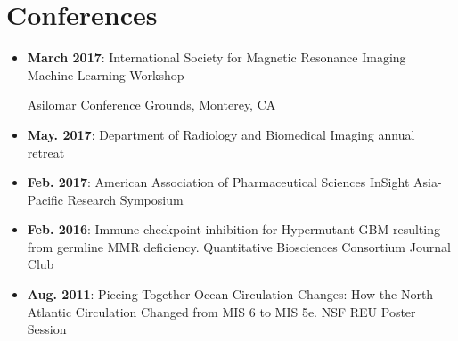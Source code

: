 \documentclass[letterpaper,11pt]{article}
\makeatletter
\newcommand{\resumeItem}[2]{
  \item\small{
    \textbf{#1}{: #2 \vspace{-2pt}}
  }
}
\newcommand{\resumeSubheading}[4]{
  \vspace{-1pt}\item
    \begin{tabular*}{0.97\textwidth}{l@{\extracolsep{\fill}}r}
      \textbf{#1} & #2 \\
      \textit{\small#3} & \textit{\small #4} \\
    \end{tabular*}\vspace{-5pt}
}
\newcommand{\resumeSubItem}[2]{\resumeItem{#1}{#2}\vspace{-4pt}}
\newcommand{\resumeSubHeadingListStart}{\begin{itemize}[leftmargin=*]}
\newcommand{\resumeSubHeadingListEnd}{\end{itemize}}
\newcommand{\resumeItemListStart}{\begin{itemize}}
\newcommand{\resumeItemListEnd}{\end{itemize}\vspace{-5pt}}
\makeatother
\begin{document}
\section{Conferences}
  \resumeSubHeadingListStart
    \resumeItem{March 2017}{International Society for Magnetic Resonance Imaging Machine Learning Workshop}
    {Asilomar Conference Grounds, Monterey, CA}
    \resumeItem{May. 2017}{Department of Radiology and Biomedical Imaging annual retreat}
    \resumeItem{Feb. 2017}{American Association of Pharmaceutical Sciences InSight Asia-Pacific Research Symposium}
    
    \resumeItem{Feb. 2016}{Immune checkpoint inhibition for Hypermutant GBM resulting from germline MMR deficiency. Quantitative Biosciences Consortium Journal Club}
    \resumeItem{Aug. 2011}{Piecing Together Ocean Circulation Changes: How the North Atlantic Circulation Changed from MIS 6 to MIS 5e. NSF REU Poster Session}
  \resumeSubHeadingListEnd
  
  
  
        
\end{document}
